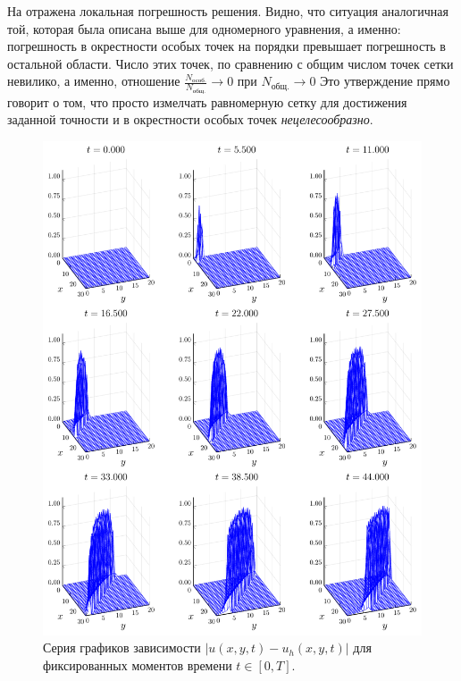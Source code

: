 На  отражена локальная погрешность решения.
Видно, что ситуация аналогичная той, которая была описана выше для одномерного уравнения, а именно: погрешность в окрестности особых точек на порядки превышает погрешность в остальной области.
Число этих точек, по сравнению с общим числом точек сетки невилико, а именно, отношение 
$
    \frac{N_{\text{особ.}}}{N_{\text{общ.}}} \rightarrow 0
$
при
$
    N_{\text{общ.}} \rightarrow 0
$
Это утверждение прямо говорит о том, что просто измелчать равномерную сетку для достижения заданной точности и в окрестности особых точек \emph{нецелесообразно}.
\begin{figure}
    \centering
    \includegraphics[width=\textwidth, keepaspectratio]{Разностные_схемы_на_статических_сетках/Программный_код_примеры_расчётов/explicit_scheme/problem_3_loc_err_wireframe.pdf}
    \caption{Серия графиков зависимости $|u(x, y, t) - u_h(x, y, t)|$ для фиксированных моментов времени $t \in [0, T]$.}
    \label{fig:problem_3_err}
\end{figure}